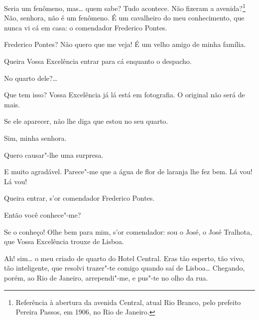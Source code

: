  Seria um fenômeno, mas\ldots{} quem sabe? Tudo acontece. Não
fizeram a avenida?\footnote{
Referência à abertura da avenida Central, atual Rio Branco, pelo prefeito Pereira Passos, em 1906, no Rio de Janeiro.} 
 Não,
senhora, não é um fenômeno.  É um cavalheiro do
meu conhecimento, que nunca vi cá em casa: o comendador Frederico
Pontes.

  Frederico Pontes? Não quero que me veja! É um velho
amigo de minha família.

 
Queira Vossa Excelência entrar para cá enquanto o despacho.

  No quarto
dele?\ldots{}

  Que tem isso? Vossa Excelência já lá
está em fotografia. O original não será de mais.

  Se ele aparecer, não lhe diga
que estou no seu quarto.

  Sim, minha senhora.

  Quero causar"-lhe uma surpresa.

  E muito agradável.  Parece"-me que a água de
flor de laranja lhe fez bem.  Lá
vou! Lá vou! 


   Queira entrar,
s'or comendador Frederico Pontes. 

  Então você conhece"-me?

  Se o conheço! Olhe bem para mim, s'or
comendador: sou o José, o José Tralhota, que Vossa Excelência trouxe de
Lisboa.

   Ah!
sim\ldots{} o meu criado de quarto do Hotel Central. Eras tão esperto, tão
vivo, tão inteligente, que resolvi trazer"-te comigo quando saí de
Lisboa\ldots{} Chegando, porém, ao Rio de Janeiro, arrependi"-me, e pus"-te no
olho da rua. 

